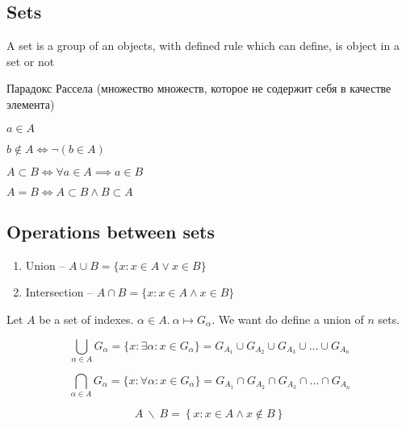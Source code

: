 \pagebreak
\subsection{Sets}


\begin{definition}[]
	A set is a group of an objects, with defined rule which can define, is object in a set or not 
\end{definition}

Парадокс Рассела (множество множеств, которое не содержит себя в качестве элемента)

$a \in A$

$b \notin A \iff \neg(b \in A)$

\begin{definition}[]
	$A \subset B \iff \forall a \in A \implies a \in B$
\end{definition}
\begin{definition}[]
	$A = B \iff A \subset B \wedge B \subset A$
\end{definition}

\subsection{Operations between sets}

\begin{enumerate}
	\item Union -- $A \cup B = \{x: x \in A \vee x \in B\}$
	\item Intersection -- $A \cap B = \{x: x \in A \wedge x \in B\}$
\end{enumerate}

Let $A$ be a set of indexes. $\alpha \in A. \ \alpha \mapsto G_\alpha$. We want do define a union of $n$ sets.

\begin{definition}[]
\[
	\bigcup_{\alpha \in A} G_\alpha = \{x : \exists \alpha: x \in G_\alpha\} = G_{A_1} \cup G_{A_2} \cup G_{A_3} \cup \dots \cup  G_{A_n} 
\]
\end{definition}

\begin{definition}[]
\[
	\bigcap_{\alpha \in A} G_\alpha = \{x : \forall \alpha: x \in G_\alpha\} = G_{A_1} \cap G_{A_2} \cap G_{A_3} \cap \dots \cap  G_{A_n} 
\]
\end{definition}

\begin{definition}[]
\[
	A \ \backslash \ B = \left\{ x: x \in A \wedge x \notin B \right\} 
\]
\end{definition}

